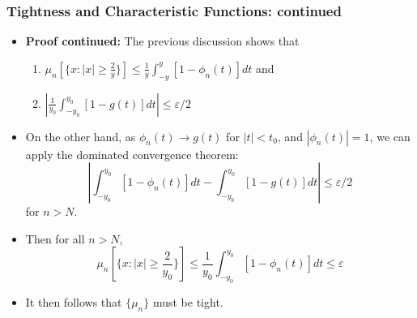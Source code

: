 \documentclass[handout]{beamer}
\begin{document}
 \frame
{
  \frametitle{Tightness and Characteristic Functions: continued}

 \begin{itemize}
 
 \item<1-> \textbf{Proof continued:} The previous discussion shows that 
 \begin{enumerate}
 \item $\mu_n[\{x: |x| \geq \frac{2}{y}\}] \leq \frac{1}{y} \int_{-y}^{y} [1-\phi_n(t)] dt$ and
 \item $\left| \frac{1}{y_0} \int_{-y_0}^{y_0} [1-g(t)] dt \right| \le \varepsilon/2$
 \end{enumerate} 
 
\item<3->[-] On the other hand, as $\phi_n(t)\rightarrow g(t)$ for  $|t|<t_0$, and $|\phi_n(t)|=1$, we can apply the dominated convergence theorem:
 $$ \left|\int_{-y_0}^{y_0} [1-\phi_n(t)] dt  -\int_{-y_0}^{y_0} [1-g(t)] dt \right| \leq \varepsilon/2 $$
  for $n>N$. 
\item<4->[-] Then for all $n>N$, 
$$\mu_n[\{x: |x| \geq \frac{2}{y_0}\}] \leq \frac{1}{y_0} \int_{-y_0}^{y_0} [1-\phi_n(t)] dt \leq \varepsilon$$
\item<5->[-] It then follows that $\{\mu_n\}$ must be tight. 

\end{itemize}
 }
 
 
 
\end{document}
